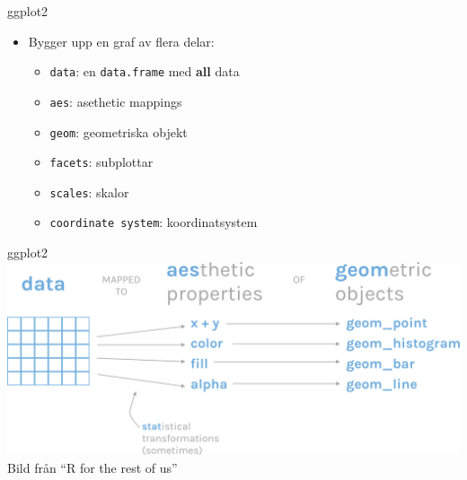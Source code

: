 \documentclass[
  11pt,
  ignorenonframetext,
  handout]{beamer}
\providecommand{\tightlist}{%
  \setlength{\itemsep}{0pt}\setlength{\parskip}{0pt}}
\begin{document}
\begin{frame}{ggplot2}
\protect\hypertarget{ggplot2-2}{}
\begin{itemize}
\tightlist
\item
  Bygger upp en graf av flera delar:

  \begin{itemize}
  \tightlist
  \item
    \texttt{data}: en \texttt{data.frame} med \textbf{all} data
  \item
    \texttt{aes}: asethetic mappings
  \item
    \texttt{geom}: geometriska objekt
  \item
    \texttt{facets}: subplottar
  \item
    \texttt{scales}: skalor
  \item
    \texttt{coordinate system}: koordinatsystem
  \end{itemize}
\end{itemize}
\end{frame}

\begin{frame}{ggplot2}
\protect\hypertarget{ggplot2-3}{}
\includegraphics{images/grammar-of-graphics.png} Bild från ``R for the
rest of us''
\end{frame}
\end{document}
